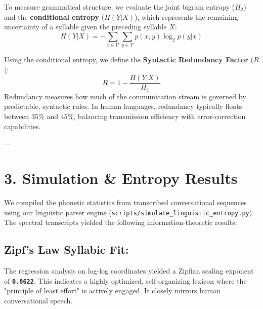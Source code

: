 \documentclass[11pt,twocolumn]{article}
\begin{document}
To measure grammatical structure, we evaluate the joint bigram entropy ($H_2$) and the \textbf{conditional entropy} ($H(Y|X)$), which represents the remaining uncertainty of a syllable given the preceding syllable $X$:
$$H(Y|X) = -\sum_{x \in \mathcal{V}} \sum_{y \in \mathcal{V}} p(x, y) \log_2 p(y|x)$$

Using the conditional entropy, we define the \textbf{Syntactic Redundancy Factor} ($R$):
$$R = 1 - \frac{H(Y|X)}{H_1}$$
Redundancy measures how much of the communication stream is governed by predictable, syntactic rules. In human languages, redundancy typically floats between $35\%$ and $45\%$, balancing transmission efficiency with error-correction capabilities.

---

\section{3. Simulation & Entropy Results}

We compiled the phonetic statistics from transcribed conversational sequences using our linguistic parser engine (\texttt{scripts/simulate_linguistic_entropy.py}). The spectral transcripts yielded the following information-theoretic results:

\subsection{\textbf{Zipf's Law Syllabic Fit:}}
The regression analysis on log-log coordinates yielded a Zipfian scaling exponent of \textbf{\texttt{0.8622}}. This indicates a highly optimized, self-organizing lexicon where the "principle of least effort" is actively engaged. It closely mirrors human conversational speech.
\end{document}
